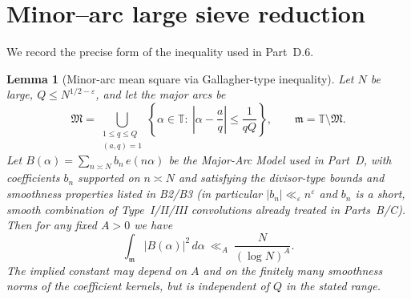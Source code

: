 \documentclass[11pt]{article}
\newtheorem{lemma}{Lemma}[part]
\theoremstyle{definition}
\theoremstyle{remark}
\numberwithin{equation}{part}
\begin{document}
\section{Minor--arc large sieve reduction}

We record the precise form of the inequality used in Part~D.6.

\begin{lemma}[Minor-arc mean square via Gallagher-type inequality]
	\label{lem:minor-L2-gallagher}
	Let $N$ be large, $Q\le N^{1/2-\varepsilon}$, and let the major arcs be
	\[
		\mathfrak M=\bigcup_{\substack{1\le q\le Q\\(a,q)=1}}
		\left\{\alpha\in\mathbb T:\ \left|\alpha-\frac{a}{q}\right|\le \frac{1}{qQ}\right\},
		\qquad \mathfrak m=\mathbb T\setminus \mathfrak M.
	\]
	Let $B(\alpha)=\sum_{n\asymp N} b_n\,e(n\alpha)$ be the Major-Arc Model used in Part~D, with coefficients $b_n$ supported on $n\asymp N$ and satisfying the divisor-type bounds and smoothness properties listed in \textup{B2/B3} (in particular $|b_n|\ll_\varepsilon n^\varepsilon$ and $b_n$ is a short, smooth combination of Type~I/II/III convolutions already treated in Parts~B/C).
	Then for any fixed $A>0$ we have
	\begin{equation}\label{eq:minor-L2-B}
		\int_{\mathfrak m}\!|B(\alpha)|^2\,d\alpha \ \ll_A\ \frac{N}{(\log N)^A}.
	\end{equation}
	The implied constant may depend on $A$ and on the finitely many smoothness norms of the coefficient kernels, but is independent of $Q$ in the stated range.
\end{lemma}
\end{document}
